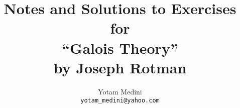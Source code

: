 \def\dotbigcupT{\DOTSB\smash{\mathop{\overset{\textstyle.}\@dotbigcupT%
                              \vphantom{\bigcup}}}%
                       \vphantom{\bigcup}\@avr{2.0}}
\def\dotbigcup{\mathop{\mathchoice{\dotbigcupD}{\dotbigcupT}
                                  {\dotbigcupT}{\dotbigcupT}}}
\let\disjunion\dotcup
\let\Disjunion\dotbigcup
\makeatother

\usepackage{array}

\usepackage{moreverb}

\newcommand{\wlogy}{without loss of generality}
\newcommand{\Wlogy}{Without loss of generality}

\title{
 Notes and Solutions to Exercises\\
 for\\
 ``Galois Theory'' \\
 by \quad Joseph Rotman}

\author{Yotam Medini\\\texttt{yotam\_medini@yahoo.com}}

\newcommand{\A}{\ensuremath{\mathbb{A}}} %
\newcommand{\C}{\mathbb{C}} %
\newcommand{\R}{\mathbb{R}} %
\newcommand{\N}{\ensuremath{\mathbb{N}}} %
\newcommand{\Q}{\ensuremath{\mathbb{Q}}} %
\newcommand{\Z}{\ensuremath{\mathbb{Z}}} %
\newcommand{\Zn}[1]{\ensuremath{\Z_{#1}}} %
\newcommand{\Zp}{\ensuremath{\Z_p}} %
\newcommand{\Zm}[1]{\Z/#1\Z} %

\newcommand{\eG}{\ensuremath{\{e\}}}

\newcommand{\gdeg}{\partial}
\newcommand{\half}{\frac{1}{2}}


\newcommand{\seq}[2]{\ensuremath{#1_1,\ldots,#1_{#2}}}
\newcommand{\seqn}[1]{\seq{#1}{n}}
\newcommand{\seqan}{\seq{a}{n}}
\newcommand{\seqxn}{\seq{x}{n}}
\newcommand{\seqalphn}{\seq{\alpha}{n}}


